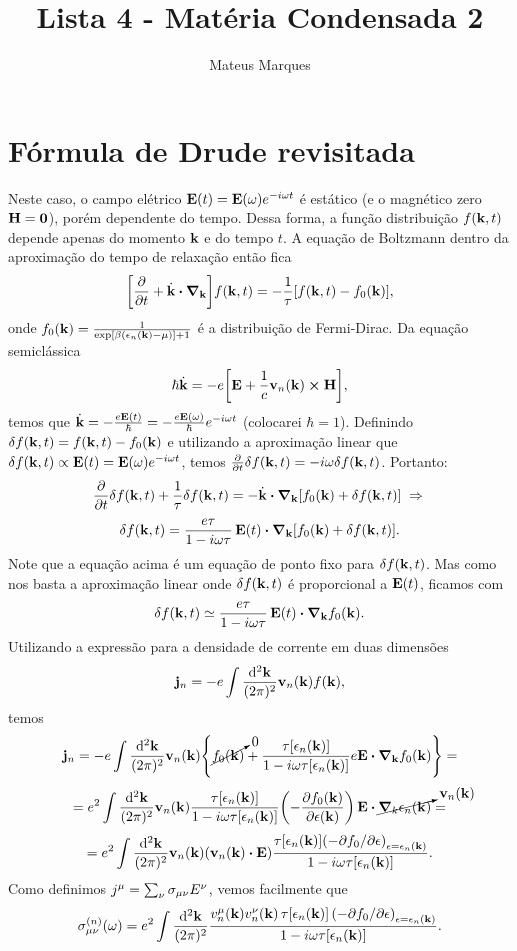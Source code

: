 \documentclass[a4paper,10pt]{article}
\title{\Huge{\textbf{Lista 4 - Matéria Condensada 2}}}
\author{Mateus Marques}
\begin{document}
\maketitle

\section{Fórmula de Drude revisitada}

Neste caso, o campo elétrico $\vb{E}(t) = \vb{E}(\omega) e^{-i\omega t}$ é estático (e o magnético zero $\vb{H}=\vb{0}$), porém dependente do tempo. Dessa forma, a função distribuição $f(\vb{k}, t)$ depende apenas do momento $\vb{k}$ e do tempo $t$. A equação de Boltzmann dentro da aproximação do tempo de relaxação então fica
$$
\qty[\pdv{t} + \dot{\k} \vdot \grad_{\k}] f(\k, t) =
-\frac{1}{\tau} \qty[f(\k,t) - f_0(\k)],
$$
onde $f_0(\vb{k}) = \frac{1}{\exp[\beta(\epsilon_n(\vb{k})-\mu)] + 1}$ é a distribuição de Fermi-Dirac. Da equação semiclássica
$$
\hbar \dot{\k} = -e \qty[\E + \frac{1}{c} \v_n(\k) \cp \vb{H}],
$$
temos que $\dot{\vb{k}} = - \frac{e \vb{E}(t)}{\hbar} = -\frac{e \vb{E}(\omega)}{\hbar} e^{-i\omega t}$ (colocarei $\hbar=1$). Definindo $\delta f(\vb{k},t) = f(\vb{k},t) - f_0(\vb{k})$ e utilizando a aproximação linear que $\delta f(\vb{k},t) \propto \vb{E}(t) = \vb{E}(\omega) e^{-i\omega t}$, temos $\pdv{t} \delta f(\vb{k},t) = - i\omega \delta f(\vb{k},t)$. Portanto:
$$
\pdv{t}\delta f(\k,t) + \frac{1}{\tau} \delta f(\k, t) =  - \dot{\k} \vdot \grad_{\k}  [f_0(\k) + \delta f(\k, t) ] \implies
$$
$$
\delta f(\k,t) = \frac{e \tau}{1-i\omega \tau} \, \E(t) \vdot \grad_{\k}  [ f_0(\k) + \delta f(\k, t) ].
$$
Note que a equação acima é um equação de ponto fixo para $\delta f(\vb{k},t)$. Mas como nos basta a aproximação linear onde $\delta f(\vb{k},t)$ é proporcional a $\vb{E}(t)$, ficamos com
$$
\delta f(\k,t) \simeq \frac{e \tau}{1-i\omega \tau} \, \E(t) \vdot \grad_{\k}  f_0(\k).
$$
Utilizando a expressão para a densidade de corrente em duas dimensões
$$
\vb{j}_n = -e \int \frac{\dd[2]{\vb{k}}}{(2\pi)^2} \vb{v}_n(\vb{k}) f(\vb{k}),
$$
temos
$$
\vb{j}_n = -e \int \frac{\dd[2]{\k}}{(2\pi)^2} \v_n(\k)
\qty{ \cancelto{0}{f_0(\k)} +
\frac{\tau[\eps_n(\k)]}{1-i\omega \tau[\eps_n(\k)]} e\E \vdot \grad_{\k} f_0(\k)} =
$$
$$
= e^2 \int \frac{\dd[2]{\k}}{(2\pi)^2} \v_n(\k)
\frac{\tau[\eps_n(\k)]}{1-i\omega \tau[\eps_n(\k)]} \qty(-\pdv{f_0(\k)}{\eps(\k)}) \, \E \vdot
\cancelto{\v_n(\k)}{\grad_k \eps_n(\k)} =
$$
$$
= e^2 \int \frac{\dd[2]{\k}}{(2\pi)^2} \v_n(\k) ( \v_n(\k) \vdot \E )
\frac{\tau[\eps_n(\k)]\qty(-\partial f_0 / \partial \eps)_{\eps = \eps_n(\k)}}{1-i\omega \tau[\eps_n(\k)]}.
$$
Como definimos $j^{\mu} = \sum_{\nu} \sigma_{\mu\nu} E^{\nu}$, vemos facilmente que
\begin{equation} \label{eq:cond}
\sigma_{\mu\nu}^{(n)}(\omega) = e^2 \int \frac{\dd[2]{\vb{k}}}{(2\pi)^2}
\frac{v_n^{\mu}(\vb{k}) v_n^{\nu}(\vb{k}) \, \tau[\epsilon_n(\vb{k})] \, \qty(-\partial f_0 / \partial \epsilon)_{\epsilon = \epsilon_n(\vb{k})}}
{1-i\omega \tau[\epsilon_n(\vb{k})]}.
\end{equation}
\end{document}
